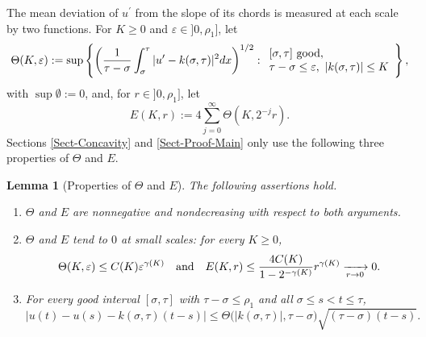 \documentclass[reqno,12pt]{amsart}
\numberwithin{equation}{section}
\def\eps{\varepsilon}
\newtheorem{lemma}[theorem]{Lemma}
\theoremstyle{remark}
\begin{document}
The mean deviation of $u^\prime$ from the slope of its chords is measured at each scale by two functions. For $K\geq0$ and $\eps\in]0,\rho_1]$, let
\begin{equation}\label{Def-Theta}
\Theta(K,\eps):=\sup\left\{\left(\frac1{\tau-\sigma}\int_\sigma^\tau|u^\prime-k(\sigma,\tau)|^2dx\right)^{1/2}:\begin{array}{l}[\sigma,\tau]\hbox{ good},\\ \tau-\sigma\leq\eps,\ |k(\sigma,\tau)|\leq K\end{array}\right\},
\end{equation}
with $\sup\emptyset:=0$, and, for $r\in]0,\rho_1]$, let
\begin{equation*}
E(K,r):=4\sum_{j=0}^\infty\Theta(K,2^{-j}r).
\end{equation*}
Sections \ref{Sect-Concavity} and \ref{Sect-Proof-Main} only use the following three properties of $\Theta$ and $E$.

\begin{lemma}[Properties of $\Theta$ and $E$]\label{L-Theta}
The following assertions hold.
\begin{enumerate}[leftmargin=3em, itemsep=0.5em, topsep=0.5em]
\item[{\rm(i)}] $\Theta$ and $E$ are nonnegative and nondecreasing with respect to both arguments.
\item[{\rm(ii)}] $\Theta$ and $E$ tend to $0$ at small scales{\rm:} for every $K\geq0$,
\begin{equation}\label{Theta}
\Theta(K,\eps)\leq C(K)\eps^{\gamma(K)}\quad\hbox{and}\quad E(K,r)\leq\frac{4C(K)}{1-2^{-\gamma(K)}}r^{\gamma(K)}\xrightarrow[r\to0]{}0.
\end{equation}
\item[{\rm(iii)}] For every good interval $[\sigma,\tau]$ with $\tau-\sigma\leq\rho_1$ and all $\sigma\leq s<t\leq\tau$,
\begin{equation}\label{CS}
\big|u(t)-u(s)-k(\sigma,\tau)(t-s)\big|\leq\Theta\big(|k(\sigma,\tau)|,\tau-\sigma\big)\sqrt{(\tau-\sigma)(t-s)}.
\end{equation}
\end{enumerate}
\end{lemma}
\end{document}
